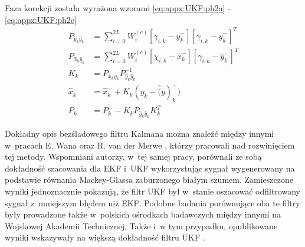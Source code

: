 Faza korekcji została wyrażona wzorami \ref{eq:appx:UKF:ph2a} - \ref{eq:appx:UKF:ph2e}
\begin{subequations}
	\begin{align}
		P_{\widehat{y}_k\widehat{y}_k} & = \sum_{i=0}^{2L}W_i^{(c)}[\gamma_{i,k} - \widehat{y}^-_k][\gamma_{i,k} - \widehat{y}^-_k]^T\label{eq:appx:UKF:ph2a} \\
		P_{\widehat{x}_k\widehat{y}_k} & = \sum_{i=0}^{2L}W_i^{(c)}[\chi_{i,k} - \widehat{x}^-_k][\gamma_{i,k} - \widehat{y}^-_k]^T\label{eq:appx:UKF:ph2b}   \\
		K_k                            & = P_{\widehat{x}_k\widehat{y}_k} P^{-1}_{\widehat{y}_k\widehat{y}_k} \label{eq:appx:UKF:ph2c}                        \\
		\widehat{x}_k                  & = \widehat{x}^-_{k} + K_k(y_k - \widehat(y)^-_k) \label{eq:appx:UKF:ph2d}                                            \\
		P_k                            & = P^-_k - K_kP_{\widehat{y}_k\widehat{y}_k}K_k^T \label{eq:appx:UKF:ph2e}                                            
	\end{align}
\end{subequations}


Dokładny opis bezśladowego filtru Kalmana można znaleźć między innymi w~pracach E. Wana oraz R. van der Merwe \cite{Wan2000, Wan2001}, którzy pracowali nad rozwinięciem tej metody. Wspomniani autorzy, w~tej samej pracy, porównali ze sobą dokładność szacowania dla EKF i~UKF wykorzystując sygnał wygenerowany na podstawie równania Mackey-Glassa \cite{Glass2010} zaburzonego białym szumem. Zamieszczone wyniki jednoznacznie pokazują, że filtr UKF był w~stanie oszacować odfiltrowany sygnał z~mniejszym błędem niż EKF. Podobne badania porównujące oba te filtry były prowadzone także w~polskich ośrodkach badawczych między innymi na Wojskowej Akademii Technicznej. Także i~w tym przypadku, opublikowane wyniki wskazywały na większą dokładność filtru UKF \cite{Konatowski2007, Konatowski2007a}.

